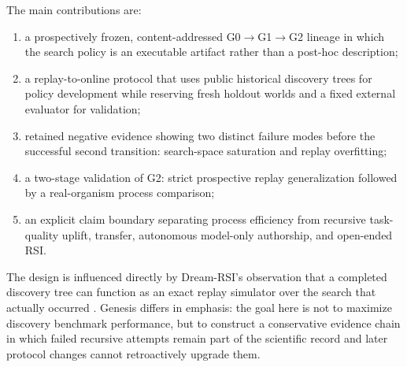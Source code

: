 The main contributions are:
\begin{enumerate}
  \item a prospectively frozen, content-addressed G0$\rightarrow$G1$\rightarrow$G2 lineage in which the search policy is an executable artifact rather than a post-hoc description;
  \item a replay-to-online protocol that uses public historical discovery trees for policy development while reserving fresh holdout worlds and a fixed external evaluator for validation;
  \item retained negative evidence showing two distinct failure modes before the successful second transition: search-space saturation and replay overfitting;
  \item a two-stage validation of G2: strict prospective replay generalization followed by a real-organism process comparison;
  \item an explicit claim boundary separating process efficiency from recursive task-quality uplift, transfer, autonomous model-only authorship, and open-ended RSI.
\end{enumerate}

The design is influenced directly by Dream-RSI's observation that a completed discovery tree can function as an exact replay simulator over the search that actually occurred \cite{zheng2026dreamrsi}. Genesis differs in emphasis: the goal here is not to maximize discovery benchmark performance, but to construct a conservative evidence chain in which failed recursive attempts remain part of the scientific record and later protocol changes cannot retroactively upgrade them.
